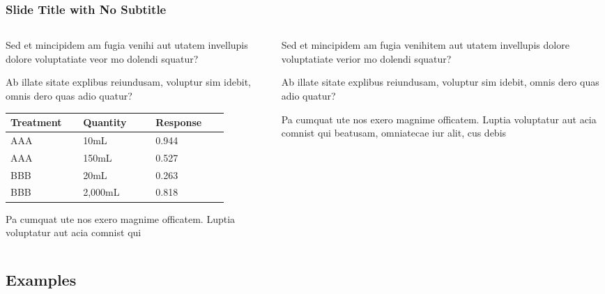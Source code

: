 \documentclass[
	aspectratio=169, %
	t, %
	onlytextwidth, %
	10pt, %
]{beamer}
\begin{document}
\begin{frame}
	\frametitle{Slide Title with No Subtitle}
	
	\begin{columns}[T] %
		\begin{column}{0.48\linewidth} %
			Sed et mincipidem am fugia venihi aut utatem invellupis dolore voluptatiate veor mo dolendi squatur?

			Ab illate sitate explibus reiundusam, voluptur sim idebit, omnis dero quas adio quatur?
			
			\begin{tabular}{L{0.28\linewidth} C{0.28\linewidth} R{0.28\linewidth}}
				\toprule
				Treatment & Quantity & Response\\
				\midrule
				AAA & 10mL & 0.944\\
				AAA & 150mL & 0.527\\
				BBB & 20mL & 0.263\\
				BBB & 2,000mL & 0.818\\
				\bottomrule
			\end{tabular}
			
			Pa cumquat ute nos exero magnime officatem. Luptia voluptatur aut acia comnist qui
		\end{column}
		\begin{column}{0.48\linewidth} %
			Sed et mincipidem am fugia venihitem aut utatem invellupis dolore voluptatiate verior mo dolendi squatur?

			Ab illate sitate explibus reiundusam, voluptur sim idebit, omnis dero quas adio quatur?

			Pa cumquat ute nos exero magnime officatem. Luptia voluptatur aut acia comnist qui beatusam, omniatecae iur alit, cus debis
		\end{column}
	\end{columns}
\end{frame}


\subsection{Examples}
\end{document}
